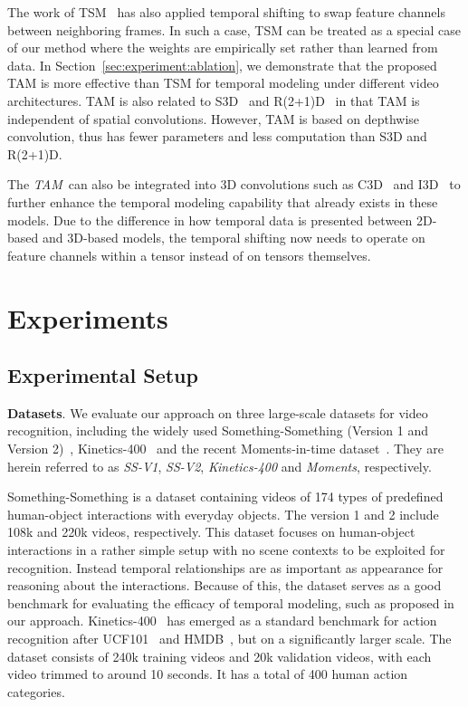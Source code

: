 \documentclass{article}
\def\TAM{\textit{TAM}\xspace}
\def\K400{\textit{Kinetics-400}\xspace}
\def\SSVone{\textit{SS-V1}\xspace}
\def\SSVtwo{\textit{SS-V2}\xspace}
\def\Moments{\textit{Moments}\xspace}
\begin{document}
The work of TSM~\cite{TSM:lin2018temporal} has also applied temporal shifting to swap feature channels between neighboring frames. In such a case, TSM can be treated as a special case of our method where the weights are empirically set rather than learned from data. In Section~\ref{sec:experiment:ablation}, we demonstrate that the proposed TAM is more effective than TSM for temporal modeling under different video architectures. TAM is also related to S3D~\cite{S3D:xie2018rethinking} and R(2+1)D~\cite{R(2+1)D:tran2018closer} in that TAM is independent of spatial convolutions. However, TAM is based on depthwise convolution, thus has fewer parameters and less computation than S3D and R(2+1)D.

The \TAM~can also be integrated into 3D convolutions such as C3D~\cite{C3D:Tran2015learning} and I3D~\cite{I3D:carreira2017quo} to further enhance the temporal modeling capability that already exists in these models. Due to the difference in how temporal data is presented between 2D-based and 3D-based models, the temporal shifting now needs to operate on feature channels within a tensor instead of on tensors themselves.
 \section{Experiments}
\label{sec:experiment}

\subsection{Experimental Setup}
\textbf{Datasets}.
We evaluate our approach on three large-scale datasets for video recognition, including the widely used Something-Something (Version 1 and Version 2)~\cite{Something:goyal2017something}, Kinetics-400~\cite{Kinetics:kay2017kinetics} and the recent Moments-in-time dataset~\cite{Moments:monfort2019moments}. They are herein referred to as \SSVone, \SSVtwo, \K400 and \Moments, respectively.


Something-Something is a dataset containing videos of 174 types of predefined human-object interactions with everyday objects. The version 1 and 2 include 108k and 220k videos, respectively. This dataset focuses on human-object interactions in a rather simple setup with no scene contexts to be exploited for recognition. Instead temporal relationships are as important as appearance for reasoning about the interactions. Because of this, the dataset serves as a good benchmark for evaluating the efficacy of temporal modeling, such as proposed in our approach. 
Kinetics-400~\cite{Kinetics:kay2017kinetics} has emerged as a standard benchmark for action recognition after UCF101~\cite{ucf101:Soomro2012} and HMDB~\cite{HMDB:Kuehne2011}, but on a significantly larger scale. The dataset consists of 240k training videos and 20k validation videos, with each video trimmed to around 10 seconds. It has a total of 400 human action categories.
\end{document}
